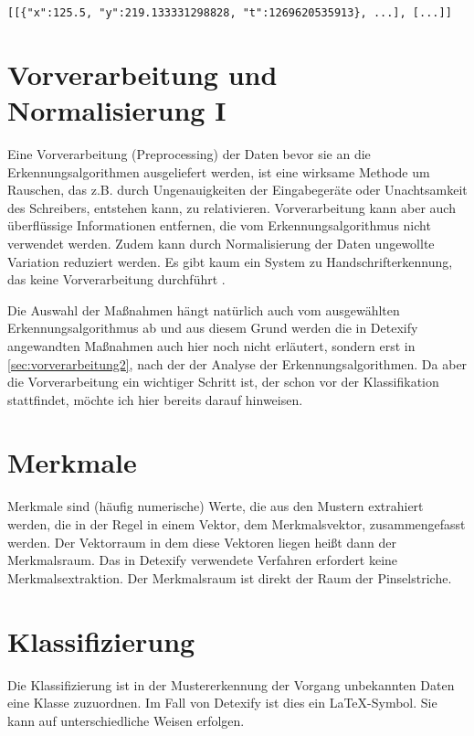 \lstinline![[{"x":125.5, "y":219.133331298828, "t":1269620535913}, ...], [...]]!

\section{Vorverarbeitung und Normalisierung I}
\label{sec:vorverarbeitung}

Eine Vorverarbeitung (Preprocessing) der Daten bevor sie an die Erkennungsalgorithmen ausgeliefert werden, ist eine wirksame Methode um Rauschen, das z.B. durch Ungenauigkeiten der Eingabegeräte oder Unachtsamkeit des Schreibers, entstehen kann, zu relativieren. Vorverarbeitung kann aber auch überflüssige Informationen entfernen, die vom Erkennungsalgorithmus nicht verwendet werden. Zudem kann durch Normalisierung der Daten ungewollte Variation reduziert werden. Es gibt kaum ein System zu Handschrifterkennung, das keine Vorverarbeitung durchführt \cite{Jaeger:2003p1097,Plamondon:2000p10303,Tappert:1990p10302}.

Die Auswahl der Maßnahmen hängt natürlich auch vom ausgewählten Erkennungsalgorithmus ab und aus diesem Grund werden die in Detexify angewandten Maßnahmen auch hier noch nicht erläutert, sondern erst in \ref{sec:vorverarbeitung2}, nach der der Analyse der Erkennungsalgorithmen. Da aber die Vorverarbeitung ein wichtiger Schritt ist, der schon vor der Klassifikation stattfindet, möchte ich hier bereits darauf hinweisen.

\section{Merkmale} \label{sec:merkmale}

Merkmale sind (häufig numerische) Werte, die aus den Mustern extrahiert werden, die in der Regel in einem Vektor, dem Merkmalsvektor, zusammengefasst werden. Der Vektorraum in dem diese Vektoren liegen heißt dann der Merkmalsraum. Das in Detexify verwendete Verfahren erfordert keine Merkmalsextraktion. Der Merkmalsraum ist direkt der Raum der Pinselstriche.

\section{Klassifizierung}

\label{sec:klassifizierung}

Die Klassifizierung ist in der Mustererkennung der Vorgang unbekannten Daten eine Klasse zuzuordnen. Im Fall von Detexify ist dies ein \LaTeX-Symbol. Sie kann auf unterschiedliche Weisen erfolgen.

